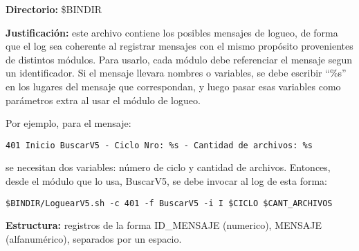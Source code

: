 \documentclass[a4paper,12pt]{article}
\begin{document}
{\bf Directorio:} \$BINDIR

{\bf Justificación:} este archivo contiene los posibles mensajes de logueo, de forma que el log sea coherente al registrar mensajes con el mismo propósito provenientes de distintos módulos. Para usarlo, cada módulo debe referenciar el mensaje segun un identificador. Si el mensaje llevara nombres o variables, se debe escribir ``\%s'' en los lugares del mensaje que correspondan, y luego pasar esas variables como parámetros extra al usar el módulo de logueo.

Por ejemplo, para el mensaje:

{\tt 401 Inicio BuscarV5 - Ciclo Nro: \%s - Cantidad de archivos: \%s}

se necesitan dos variables: número de ciclo y cantidad de archivos. Entonces, desde el módulo que lo usa, BuscarV5, se debe invocar al log de esta forma:

{\tt \$BINDIR/LoguearV5.sh -c 401 -f BuscarV5 -i I \$CICLO \$CANT\_ARCHIVOS}

{\bf Estructura:} registros de la forma ID\_MENSAJE (numerico), MENSAJE (alfanumérico), separados por un espacio.
\end{document}
